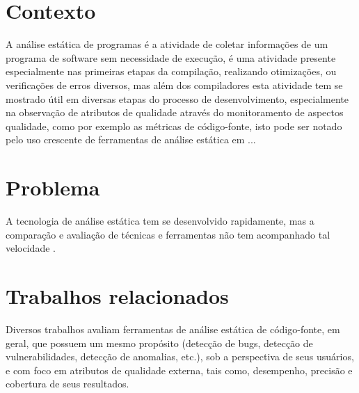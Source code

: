 
%

\section{Contexto}
A análise estática de programas é a atividade de coletar informações de um
programa de software sem necessidade de execução, é uma atividade presente
especialmente nas primeiras etapas da compilação, realizando otimizações, ou
verificações de erros diversos, mas além dos compiladores esta atividade tem
se mostrado útil em diversas etapas do processo de desenvolvimento,
especialmente na observação de atributos de qualidade através do monitoramento
de aspectos qualidade, como por exemplo as métricas de código-fonte, isto pode
ser notado pelo uso crescente de ferramentas de análise estática em ...

\section{Problema}

A tecnologia de análise estática tem se desenvolvido rapidamente, mas a
comparação e avaliação de técnicas e ferramentas não tem acompanhado tal
velocidade \cite{Li2010}.

\section{Trabalhos relacionados}

Diversos trabalhos avaliam ferramentas de análise estática de código-fonte,
em geral, que possuem um mesmo propósito (detecção de bugs, 
detecção de vulnerabilidades, detecção de anomalias, etc.),
sob a perspectiva de seus usuários, 
e com foco em atributos de qualidade externa, tais como, desempenho, 
precisão e cobertura de seus resultados. 

